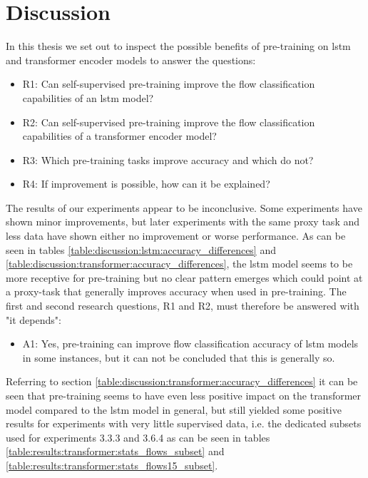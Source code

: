 \chapter{Discussion} \label{sec:discussion}

In this thesis we set out to inspect the possible benefits of pre-training on \gls{lstm} and transformer encoder models to answer the questions:

\begin{itemize}
	\item R1: Can self-supervised pre-training improve the flow classification capabilities of an \gls{lstm} model?
	\item R2: Can self-supervised pre-training improve the flow classification capabilities of a transformer encoder model?
	\item R3: Which pre-training tasks improve accuracy and which do not?
	\item R4: If improvement is possible, how can it be explained?
\end{itemize}

The results of our experiments appear to be inconclusive. Some experiments have shown minor improvements, but later experiments with the same proxy task and less data have shown either no improvement or worse performance. As can be seen in tables \ref{table:discussion:lstm:accuracy_differences} and \ref{table:discussion:transformer:accuracy_differences}, the \gls{lstm} model seems to be more receptive for pre-training but no clear pattern emerges which could point at a proxy-task that generally improves accuracy when used in pre-training. The first and second research questions, R1 and R2, must therefore be answered with "it depends":

\begin{itemize}
	\item A1: Yes, pre-training can improve flow classification accuracy of \gls{lstm} models in some instances, but it can not be concluded that this is generally so.
\end{itemize}

Referring to section \ref{table:discussion:transformer:accuracy_differences} it can be seen that pre-training seems to have even less positive impact on the transformer model compared to the \gls{lstm} model in general, but still yielded some positive results for experiments with very little supervised data, i.e. the dedicated subsets used for experiments 3.3.3 and 3.6.4 as can be seen in tables \ref{table:results:transformer:stats_flows_subset} and \ref{table:results:transformer:stats_flows15_subset}.

